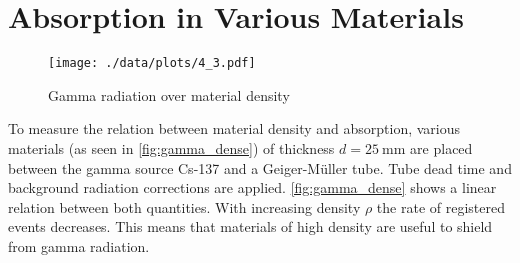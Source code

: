 \section{Absorption in Various Materials}
\begin{figure}[htb]
	\centering
	\texttt{[image: ./data/plots/4\_3.pdf]}
	\caption[Gamma radiation over material density]{Gamma radiation over material density}
	\label{fig:gamma_dense}
\end{figure}
To measure the relation between material density and absorption, various materials (as seen in \autoref{fig:gamma_dense}) of thickness $d=\SI{25}{\milli\meter}$ are placed between the gamma source Cs-137 and a Geiger-Müller tube.
Tube dead time and background radiation corrections are applied.
\autoref{fig:gamma_dense} shows a linear relation between both quantities.
With increasing density $\rho$ the rate of registered events decreases.
This means that materials of high density are useful to shield from gamma radiation.
